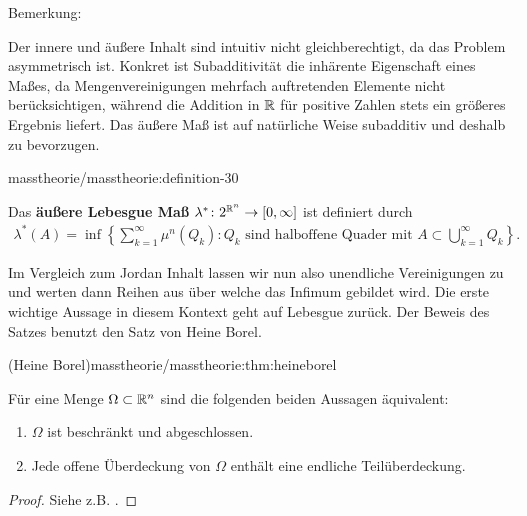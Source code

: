 \begin{emphBox}{}{}{Bemerkung:}
\par
Der innere und äußere Inhalt sind intuitiv nicht gleichberechtigt, da das Problem asymmetrisch ist. Konkret ist Subadditivität die inhärente Eigenschaft eines Maßes, da Mengenvereinigungen mehrfach auftretenden Elemente nicht berücksichtigen, während die Addition in \(\mathbb{R}\) für positive Zahlen stets ein größeres Ergebnis liefert. Das äußere Maß ist auf natürliche Weise subadditiv und deshalb zu bevorzugen.
\end{emphBox}
\begin{definition}{}{masstheorie/masstheorie:definition-30}



\par
Das \textbf{äußere Lebesgue Maß} \(\lambda^* \colon 2^{\mathbb{R}^n} \rightarrow [0,\infty]\) ist definiert durch
\begin{align*}
\lambda^*(A) = \inf \left\{ \sum_{k=1}^\infty \mu^n(Q_k) : Q_k \text{ sind halboffene Quader mit } A \subset \bigcup_{k=1}^\infty Q_k \right\}.
\end{align*}\end{definition}

\par
Im Vergleich zum Jordan Inhalt lassen wir nun also unendliche Vereinigungen zu und werten dann Reihen aus über welche das Infimum gebildet wird. Die erste wichtige Aussage in diesem Kontext geht auf Lebesgue zurück. Der Beweis des Satzes benutzt den Satz von Heine Borel.
\begin{theorem}{(Heine Borel)}{masstheorie/masstheorie:thm:heineborel}



\par
Für eine Menge \(\Omega\subset\mathbb{R}^n\) sind die folgenden beiden Aussagen äquivalent:
\begin{enumerate}

\item {} 
\par
\(\Omega\) ist beschränkt und abgeschlossen.

\item {} 
\par
Jede offene Überdeckung von \(\Omega\) enthält eine endliche Teilüberdeckung.

\end{enumerate}
\end{theorem}

\begin{proof}
 Siehe z.B. \cite{For17}.
\end{proof}


